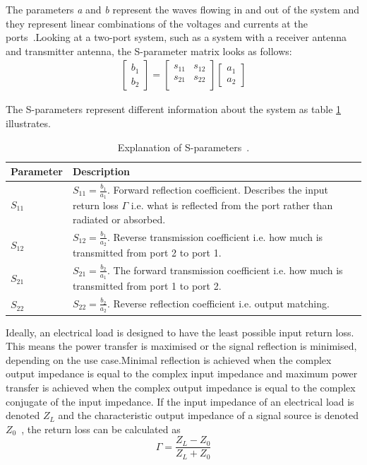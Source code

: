 The parameters \textit{a} and \textit{b} represent the waves flowing in and out of the system and they represent linear combinations of the voltages and currents at the ports~\cite{ming_notes}.Looking at a two-port system, such as a system with a receiver antenna and transmitter antenna, the S-parameter matrix looks as follows:
\begin{align} \label{eq:s_matrix}
    \begin{bmatrix} b_1 \\ b_2 \end{bmatrix} = 
    \begin{bmatrix} s_{11} & s_{12} \\ s_{21} & s_{22} \\ \end{bmatrix} \begin{bmatrix} a_1 \\ a_2 \end{bmatrix}
\end{align}

The S-parameters represent different information about the system as table \ref{tab:s_params} illustrates.
\begin{table}[H]
    \centering
    \begin{tabular}{p{}|p{}}
        \textbf{Parameter} & \textbf{Description} \\
        \hline
        \hline
        $S_{11}$ & $S_{11}=\frac{b_1}{a_1}$. Forward reflection coefficient. Describes the input return loss $\Gamma$ i.e. what is reflected from the port rather than radiated or absorbed. \\
        $S_{12}$ & $S_{12}=\frac{b_1}{a_2}$. Reverse transmission coefficient i.e. how much is transmitted from port 2 to port 1. \\
        $S_{21}$ & $S_{21}=\frac{b_2}{a_1}$. The forward transmission coefficient i.e. how much is transmitted from port 1 to port 2. \\
        $S_{22}$ & $S_{22}=\frac{b_2}{a_2}$. Reverse reflection coefficient i.e. output matching. \\
    \end{tabular}
    \caption{Explanation of S-parameters~\cite{s_params}.}
    \label{tab:s_params}
\end{table}

Ideally, an electrical load is designed to have the least possible input return loss. This means the power transfer is maximised or the signal reflection is minimised, depending on the use case.Minimal reflection is achieved when the complex output impedance is equal to the complex input impedance and maximum power transfer is achieved when the complex output impedance is equal to the complex conjugate of the input impedance. If the input impedance of an electrical load is denoted $Z_L$ and the characteristic output impedance of a signal source is denoted $Z_0$~\cite{s_params}\cite{ming_notes}, the return loss can be calculated as
\begin{equation} \label{return_loss}
    \Gamma = \frac{Z_L-Z_0}{Z_L+Z_0}
\end{equation}

